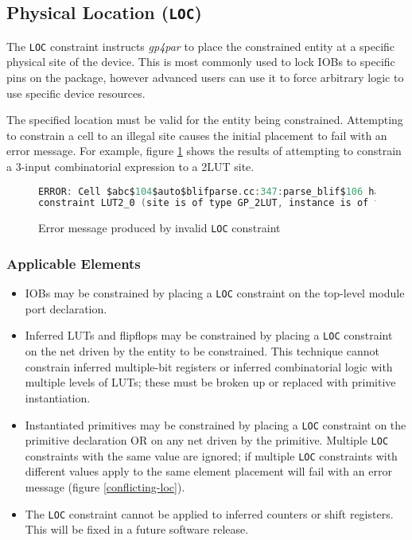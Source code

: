\documentclass[11pt]{article}
\newcommand{\namestyle}[1]{\textit{#1}}
\newcommand{\tokenstyle}[1]{\texttt{#1}}
\begin{document}

\pagebreak
\subsection{Physical Location (\tokenstyle{LOC})}

The \tokenstyle{LOC} constraint instructs \namestyle{gp4par} to place the constrained entity at a specific physical
site of the device. This is most commonly used to lock IOBs to specific pins on the package, however advanced users can 
use it to force arbitrary logic to use specific device resources.

The specified location must be valid for the entity being constrained. Attempting to constrain a cell to an illegal 
site causes the initial placement to fail with an error message. For example, figure \ref{invalid-loc} shows the 
results of attempting to constrain a 3-input combinatorial expression to a 2LUT site.

\begin{figure}[h]
\begin{lstlisting}[language=c]
ERROR: Cell $abc$104$auto$blifparse.cc:347:parse_blif$106 has invalid LOC
constraint LUT2_0 (site is of type GP_2LUT, instance is of type GP_3LUT)
\end{lstlisting}
\caption{Error message produced by invalid \tokenstyle{LOC} constraint}
\label{invalid-loc}
\end{figure}

\subsubsection{Applicable Elements}

\begin{itemize}

\item IOBs may be constrained by placing a \tokenstyle{LOC} constraint on the top-level module port declaration.

\item Inferred LUTs and flipflops may be constrained by placing a \tokenstyle{LOC} constraint on the net driven by the 
entity to be constrained. This technique cannot constrain inferred multiple-bit registers or inferred 
combinatorial logic with multiple levels of LUTs; these must be broken up or replaced with primitive instantiation.

\item Instantiated primitives may be constrained by placing a \tokenstyle{LOC} constraint on the primitive declaration 
OR on any net driven by the primitive. Multiple \tokenstyle{LOC} constraints with the same value are ignored; if 
multiple \tokenstyle{LOC} constraints with different values apply to the same element placement will fail with an error 
message (figure \ref{conflicting-loc}).

\item The \tokenstyle{LOC} constraint cannot be applied to inferred counters or shift registers. This will be fixed in 
a future software release.

\end{itemize}
\end{document}
